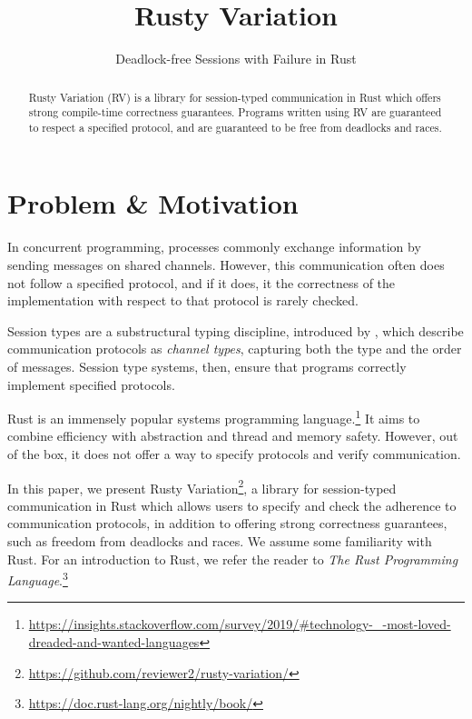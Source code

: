 \documentclass[sigconf,natbib=false]{acmart}
\begin{document}
\title{Rusty Variation}
\subtitle{Deadlock-free Sessions with Failure in Rust}
\author{%
}
\affiliation{%
}
\email{%
}

\begin{abstract}
  Rusty Variation (RV) is a library for session-typed communication in Rust which offers strong compile-time correctness guarantees. Programs written using RV are guaranteed to respect a specified protocol, and are guaranteed to be free from deadlocks and races.
\end{abstract}

\maketitle

\section{Problem \& Motivation}\label{sec:motivation}
In concurrent programming, processes commonly exchange information by sending messages on shared channels. However, this communication often does not follow a specified protocol, and if it does, it the correctness of the implementation with respect to that protocol is rarely checked.

Session types are a substructural typing discipline, introduced by \textcite{honda1993}, which describe communication protocols as \emph{channel types}, capturing both the type and the order of messages. Session type systems, then, ensure that programs correctly implement specified protocols.

Rust is an immensely popular systems programming language.\footnote{\url{https://insights.stackoverflow.com/survey/2019/\#technology-\_-most-loved-dreaded-and-wanted-languages}} It aims to combine efficiency with abstraction and thread and memory safety. However, out of the box, it does not offer a way to specify protocols and verify communication.

In this paper, we present Rusty Variation\footnote{\url{https://github.com/reviewer2/rusty-variation/}}, a library for session-typed communication in Rust which allows users to specify and check the adherence to communication protocols, in addition to offering strong correctness guarantees, such as freedom from deadlocks and races.
We assume some familiarity with Rust. For an introduction to Rust, we refer the reader to \textit{The Rust Programming Language}.\footnote{\url{https://doc.rust-lang.org/nightly/book/}}
\end{document}
